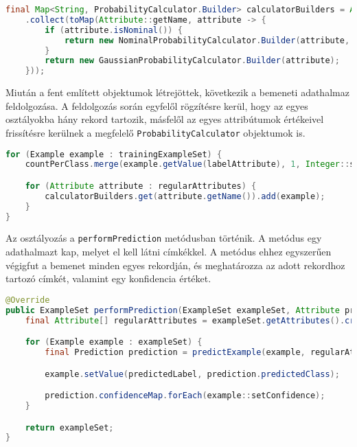 \documentclass[a4paper]{article}
\begin{document}
\begin{lstlisting}[language=Java, caption={A valószínűségi becsléseket meghatározó \texttt{ProbabilityCalculator} objektumok létrehozása.}, captionpos=b, escapechar=$]
final Map<String, ProbabilityCalculator.Builder> calculatorBuilders = Arrays.stream(regularAttributes)
    .collect(toMap(Attribute::getName, attribute -> {
        if (attribute.isNominal()) {
            return new NominalProbabilityCalculator.Builder(attribute, m, priors);
        }
        return new GaussianProbabilityCalculator.Builder(attribute);
    }));
\end{lstlisting}

Miután a fent említett objektumok létrejöttek, következik a bemeneti adathalmaz feldolgozása. A feldolgozás során egyfelől rögzítésre kerül, hogy az egyes osztályokba hány rekord tartozik, másfelől az egyes attribútumok értékeivel frissítésre kerülnek a megfelelő \texttt{ProbabilityCalculator} objektumok is.

\begin{lstlisting}[language=Java, caption={A bemeneti adathalmaz feldolgozása.}, captionpos=b, escapechar=$]
for (Example example : trainingExampleSet) {
    countPerClass.merge(example.getValue(labelAttribute), 1, Integer::sum);

    for (Attribute attribute : regularAttributes) {
        calculatorBuilders.get(attribute.getName()).add(example);
    }
}
\end{lstlisting}

Az osztályozás a \texttt{performPrediction} metódusban történik. A metódus egy adathalmazt kap, melyet el kell látni címkékkel. A metódus ehhez egyszerűen végigfut a bemenet minden egyes rekordján, és meghatározza az adott rekordhoz tartozó címkét, valamint egy konfidencia értéket.

\begin{lstlisting}[language=Java, caption={Adathalmaz rekordjainak osztályozása.}, captionpos=b, escapechar=$]
@Override
public ExampleSet performPrediction(ExampleSet exampleSet, Attribute predictedLabel) {
    final Attribute[] regularAttributes = exampleSet.getAttributes().createRegularAttributeArray();

    for (Example example : exampleSet) {
        final Prediction prediction = predictExample(example, regularAttributes);

        example.setValue(predictedLabel, prediction.predictedClass);

        prediction.confidenceMap.forEach(example::setConfidence);
    }

    return exampleSet;
}
\end{lstlisting}
\end{document}
